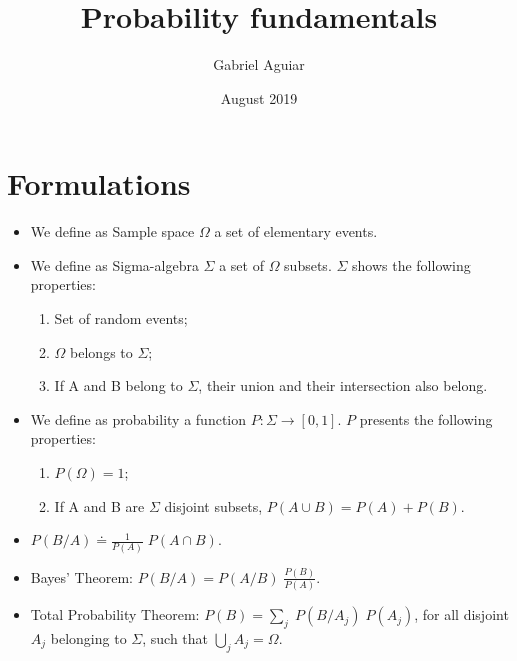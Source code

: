 \documentclass{article}
\title{Probability fundamentals}
\author{Gabriel Aguiar}
\date{August 2019}
\begin{document}
\maketitle

\section{Formulations}

\begin{itemize}
    
\item We define as Sample space $\Omega$ a set of elementary events.

\item We define as Sigma-algebra $\Sigma$ a set of $\Omega$ subsets. $\Sigma$ shows the following properties:

\begin{enumerate}

\item Set of random events;

\item $\Omega$ belongs to $\Sigma$;

\item If A and B belong to $\Sigma$, their union and their intersection also belong.

\end{enumerate}
        
\item We define as probability a function $P: \Sigma \rightarrow [0, 1]$. $P$ presents the following properties:

\begin{enumerate}

\item $P(\Omega) = 1$; 

\item If A and B are $\Sigma$ disjoint subsets, $P(A \cup B) = P(A) + P(B)$.

\end{enumerate}

\item $P(B/A) \doteq \frac{1}{P(A)} \; P(A \cap B)$.

\item Bayes' Theorem: $P(B/A) = P(A/B) \; \frac{P(B)}{P(A)}$.

\item Total Probability Theorem: $P(B) = \sum\limits_{j} \; P(B/A_{j}) \; P(A_{j})$, for all disjoint $A_{j}$ belonging to $\Sigma$, such that $\bigcup\limits_{j} A_{j} = \Omega$.
        
\end{itemize}
\end{document}
